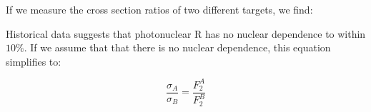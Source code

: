 If we measure the cross section ratios of two different targets, we find:


Historical data suggests that photonuclear R has no nuclear dependence to within $10\%$. If we assume that that there is no nuclear dependence, this equation simplifies to:

\begin{equation}
	\frac{\sigma_A}{\sigma_B} = \frac{F_2^A}{F_2^B}
\end{equation}
